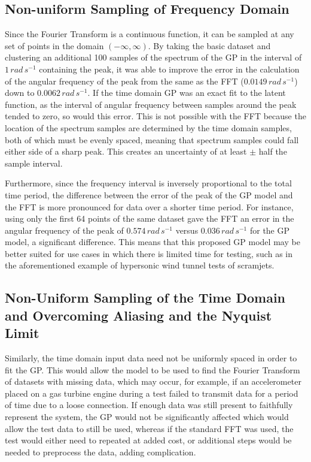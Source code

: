 \documentclass[12pt]{article}
\begin{document}
    \subsection{Non-uniform Sampling of Frequency Domain}
    Since the Fourier Transform is a continuous function, it can be sampled at any set of points in the domain $(-\infty, \infty)$.
    By taking the basic dataset and clustering an additional 100 samples of the spectrum of the GP in the interval of $1 \, rad \, s^{-1}$ containing the peak, it was able to improve the error in the calculation of the angular frequency of the peak from the same as the FFT ($0.0149 \, rad \, s^{-1}$) down to $0.0062 \, rad \, s^{-1} $.
    If the time domain GP was an exact fit to the latent function, as the interval of angular frequency between samples around the peak tended to zero, so would this error.
    This is not possible with the FFT because the location of the spectrum samples are determined by the time domain samples, both of which must be evenly spaced, meaning that spectrum samples could fall either side of a sharp peak.
    This creates an uncertainty of at least $\pm$ half the sample interval.

    Furthermore, since the frequency interval is inversely proportional to the total time period, the difference between the error of the peak of the GP model and the FFT is more pronounced for data over a shorter time period.
    For instance, using only the first 64 points of the same dataset gave the FFT an error in the angular frequency of the peak of $0.574 \, rad \, s^{-1}$ versus $0.036 \, rad \, s^{-1}$ for the GP model, a significant difference.
    This means that this proposed GP model may be better suited for use cases in which there is limited time for testing, such as in the aforementioned example of hypersonic wind tunnel tests of scramjets.

    \subsection{Non-Uniform Sampling of the Time Domain and Overcoming Aliasing and the Nyquist Limit}
    Similarly, the time domain input data need not be uniformly spaced in order to fit the GP\@.
    This would allow the model to be used to find the Fourier Transform of datasets with missing data, which may occur, for example, if an accelerometer placed on a gas turbine engine during a test failed to transmit data for a period of time due to a loose connection.
    If enough data was still present to faithfully represent the system, the GP would not be significantly affected which would allow the test data to still be used, whereas if the standard FFT was used, the test would either need to repeated at added cost, or additional steps would be needed to preprocess the data, adding complication.
\end{document}
